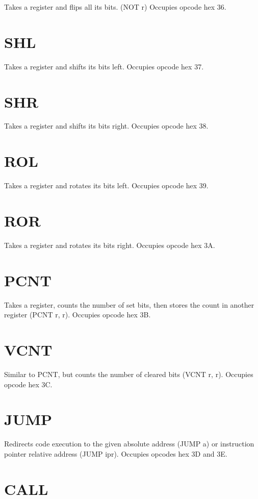 \documentclass[letterpaper,12pt]{book}
\begin{document}
Takes a register and flips all its bits. (NOT r) Occupies opcode hex 36.

\section{SHL}

Takes a register and shifts its bits left. Occupies opcode hex 37.

\section{SHR}

Takes a register and shifts its bits right. Occupies opcode hex 38.

\section{ROL}

Takes a register and rotates its bits left. Occupies opcode hex 39.

\section{ROR}

Takes a register and rotates its bits right. Occupies opcode hex 3A.

\section{PCNT}

Takes a register, counts the number of set bits, then stores the count in another register (PCNT r, r). Occupies opcode hex 3B.

\section{VCNT}

Similar to PCNT, but counts the number of cleared bits (VCNT r, r). Occupies opcode hex 3C.

\section{JUMP}

Redirects code execution to the given absolute address (JUMP a) or instruction pointer relative address (JUMP ipr). Occupies opcodes hex 3D and 3E.

\section{CALL}
\end{document}
